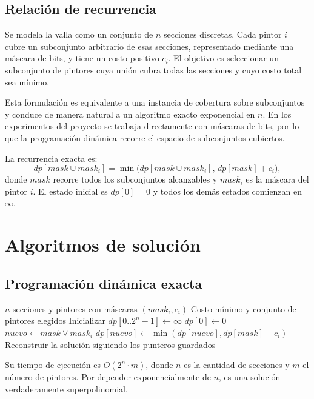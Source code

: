 \documentclass[11pt]{article}
\begin{document}
\subsection{Relación de recurrencia}
\noindent
Se modela la valla como un conjunto de $n$ secciones discretas. Cada pintor $i$ cubre un subconjunto arbitrario de esas secciones, representado mediante una máscara de bits, y tiene un costo positivo $c_i$. El objetivo es seleccionar un subconjunto de pintores cuya unión cubra todas las secciones y cuyo costo total sea mínimo.

Esta formulación es equivalente a una instancia de cobertura sobre subconjuntos y conduce de manera natural a un algoritmo exacto exponencial en $n$. En los experimentos del proyecto se trabaja directamente con máscaras de bits, por lo que la programación dinámica recorre el espacio de subconjuntos cubiertos.

La recurrencia exacta es:
\[
dp[mask \cup mask_i] = \min\bigl(dp[mask \cup mask_i],\, dp[mask] + c_i\bigr),
\]
donde $mask$ recorre todos los subconjuntos alcanzables y $mask_i$ es la máscara del pintor $i$. El estado inicial es $dp[0] = 0$ y todos los demás estados comienzan en $\infty$.

\section{Algoritmos de solución}
\subsection{Programación dinámica exacta}
\begin{algorithm}[H]
\caption{DP exacta para cobertura de subconjuntos}
\begin{algorithmic}[1]
\Require $n$ secciones y pintores con máscaras $(mask_i, c_i)$
\Ensure Costo mínimo y conjunto de pintores elegidos
\State Inicializar $dp[0..2^n-1] \leftarrow \infty$
\State $dp[0] \leftarrow 0$
        \State $nuevo \leftarrow mask \lor mask_i$
        \State $dp[nuevo] \leftarrow \min(dp[nuevo], dp[mask] + c_i)$
    \EndFor
\EndFor
\State Reconstruir la solución siguiendo los punteros guardados
\end{algorithmic}
\end{algorithm}

Su tiempo de ejecución es $O(2^n \cdot m)$, donde $n$ es la cantidad de secciones y $m$ el número de pintores. Por depender exponencialmente de $n$, es una solución verdaderamente superpolinomial.
\end{document}
